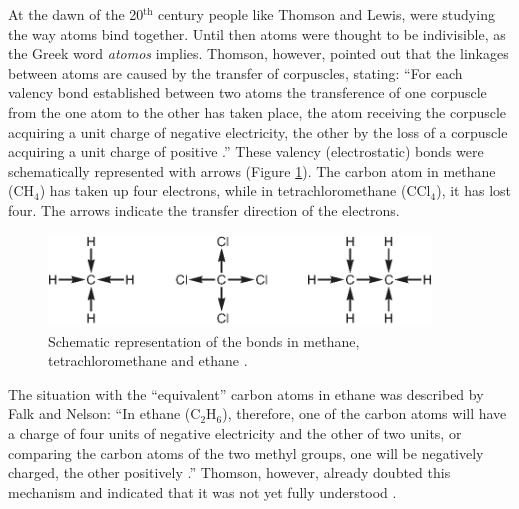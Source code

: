 At the dawn of the 20$^\mathrm{th}$ century people like Thomson and Lewis, were studying the way atoms bind together. Until then atoms were thought to be indivisible, as the Greek word \textit{atomos} implies. Thomson, however, pointed out that the linkages between atoms are caused by the transfer of corpuscles, stating: ``For each valency bond established between two atoms the transference of one corpuscle from the one atom to the other has taken place, the atom receiving the corpuscle acquiring a unit charge of negative electricity, the other by the loss of a corpuscle acquiring a unit charge of positive \cite{thomson}.'' These valency (electrostatic) bonds were schematically represented with arrows (Figure \ref{ch1.fig1}). The carbon atom in methane (CH$_4$) has taken up four electrons, while in tetrachloromethane (CCl$_4$), it has lost four. The arrows indicate the transfer direction of the electrons. 
\begin{figure}[htdp]
\center
\includegraphics[width=4in]{introduction/figures/figure1.eps}
\caption{Schematic representation of the bonds in methane, tetrachloromethane and ethane \cite{falk}.}
\label{ch1.fig1}
\end{figure}
The situation with the ``equivalent'' carbon atoms in ethane was described by Falk and Nelson: ``In ethane (C$_2$H$_6$), therefore, one of the carbon atoms will have a charge of four units of negative electricity and the other of two units, or comparing the carbon atoms of the two methyl groups, one will be negatively charged, the other positively \cite{falk}.'' Thomson, however, already doubted this mechanism and indicated that it was not yet fully understood \cite{thomson}.

